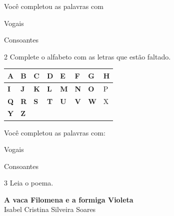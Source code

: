 
Você completou as palavras com

\begin{boxlist}
\boxitem[] Vogais 

\boxitem[] Consoantes
\end{boxlist}


\num{2} Complete o alfabeto com as letras que estão faltado.

\begin{longtable}[]{@{}llllllll@{}}
\toprule
\textbf{A } & \textbf{B} & \textbf{C} & \textbf{D} & \textbf{E} &
\textbf{F} & \textbf{G} & H\tabularnewline
\midrule
\endhead
\textbf{I} & \textbf{J} & \textbf{K} & \textbf{L} & \textbf{M} &
\textbf{N} & \textbf{O} & P\tabularnewline
\textbf{Q} & \textbf{R} & \textbf{S} & \textbf{T} & \textbf{U} &
\textbf{V} & \textbf{W} & X\tabularnewline
\textbf{Y} & \textbf{Z}\tabularnewline
\bottomrule
\end{longtable}

Você completou as palavras com:

\begin{boxlist}
\boxitem[] Vogais 

\boxitem[] Consoantes
\end{boxlist}


\num{3} Leia o poema.

\textbf{A vaca Filomena e a formiga Violeta}\\
Isabel Cristina Silveira Soares

